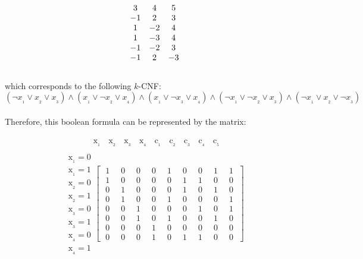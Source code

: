 \documentclass[12pt]{article}
\begin{document}
\begin{displaymath}
  \begin{array}{c c c}
    3 & 4 & 5 \\
    -1 & 2 & 3 \\
    1 & -2 & 4 \\
    1 & -3 & 4 \\
    -1 & -2 & 3 \\
    -1 & 2 & -3
  \end{array}
\end{displaymath}
\\
which corresponds to the following $k$-CNF:
\begin{displaymath}
  ( \lnot x_{_1} \lor x_{_2} \lor x_{_3} ) \land ( x_{_1} \lor \lnot x_{_2} \lor x_{_4} ) \land ( x_{_1} \lor \lnot x_{_3} \lor x_{_4} ) \land ( \lnot x_{_1} \lor \lnot x_{_2} \lor x_{_3} ) \land ( \lnot x_{_1} \lor x_{_2} \lor \lnot x_{_3} )
\end{displaymath}
\\[-25pt]

Therefore, this boolean formula can be represented by the matrix:

\begin{gather*}
  \begin{matrix}
    \qquad \;\;\;\, \mathrm{x_{_1}} & \, \mathrm{x_{_2}} & \, \mathrm{x_{_3}} & \, \mathrm{x_{_4}} & \, \mathrm{c_{_1}} & \, \mathrm{c_{_2}} & \, \mathrm{c_{_3}} & \, \mathrm{c_{_4}} & \, \mathrm{c_{_5}}
  \end{matrix} \\
  \begin{matrix}
    \mathrm{x_{_1} = 0} \\
    \mathrm{x_{_1} = 1} \\
    \mathrm{x_{_2} = 0} \\
    \mathrm{x_{_2} = 1} \\
    \mathrm{x_{_3} = 0} \\
    \mathrm{x_{_3} = 1} \\
    \mathrm{x_{_4} = 0} \\
    \mathrm{x_{_4} = 1}
  \end{matrix}
  \begin{bmatrix}
    \;1\; & \;0\; & \;0\; & \;0\; & \;1\; & \;0\; & \;0\; & \;1\; & \;1\; \\
    \;1\; & \;0\; & \;0\; & \;0\; & \;0\; & \;1\; & \;1\; & \;0\; & \;0\; \\
    \;0\; & \;1\; & \;0\; & \;0\; & \;0\; & \;1\; & \;0\; & \;1\; & \;0\; \\
    \;0\; & \;1\; & \;0\; & \;0\; & \;1\; & \;0\; & \;0\; & \;0\; & \;1\; \\
    \;0\; & \;0\; & \;1\; & \;0\; & \;0\; & \;0\; & \;1\; & \;0\; & \;1\; \\
    \;0\; & \;0\; & \;1\; & \;0\; & \;1\; & \;0\; & \;0\; & \;1\; & \;0\; \\
    \;0\; & \;0\; & \;0\; & \;1\; & \;0\; & \;0\; & \;0\; & \;0\; & \;0\; \\
    \;0\; & \;0\; & \;0\; & \;1\; & \;0\; & \;1\; & \;1\; & \;0\; & \;0\;
  \end{bmatrix}
\end{gather*}
\\
\end{document}
